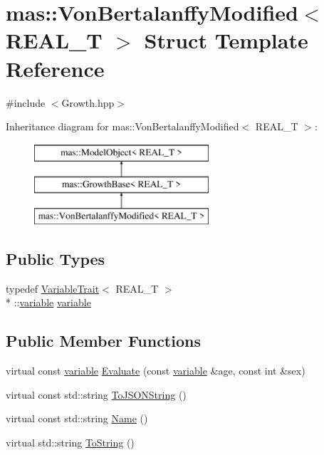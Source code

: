 \hypertarget{structmas_1_1_von_bertalanffy_modified}{\section{mas\-:\-:Von\-Bertalanffy\-Modified$<$ R\-E\-A\-L\-\_\-\-T $>$ Struct Template Reference}
\label{structmas_1_1_von_bertalanffy_modified}
}


{\ttfamily \#include $<$Growth.\-hpp$>$}

Inheritance diagram for mas\-:\-:Von\-Bertalanffy\-Modified$<$ R\-E\-A\-L\-\_\-\-T $>$\-:\begin{figure}[H]
\begin{center}
\leavevmode
\includegraphics[height=3.000000cm]{structmas_1_1_von_bertalanffy_modified}
\end{center}
\end{figure}
\subsection*{Public Types}
\begin{DoxyCompactItemize}
\item 
typedef \hyperlink{structmas_1_1_variable_trait}{Variable\-Trait}$<$ R\-E\-A\-L\-\_\-\-T $>$\\*
\-::\hyperlink{structmas_1_1_von_bertalanffy_modified_af5a89449b12de884a01c34464ba2bae0}{variable} \hyperlink{structmas_1_1_von_bertalanffy_modified_af5a89449b12de884a01c34464ba2bae0}{variable}
\end{DoxyCompactItemize}
\subsection*{Public Member Functions}
\begin{DoxyCompactItemize}
\item 
virtual const \hyperlink{structmas_1_1_von_bertalanffy_modified_af5a89449b12de884a01c34464ba2bae0}{variable} \hyperlink{structmas_1_1_von_bertalanffy_modified_ac5e51a32119b7353bb32d64f440416c7}{Evaluate} (const \hyperlink{structmas_1_1_von_bertalanffy_modified_af5a89449b12de884a01c34464ba2bae0}{variable} \&age, const int \&sex)
\item 
virtual const std\-::string \hyperlink{structmas_1_1_von_bertalanffy_modified_a47465618fc2471ad0f47f94fe3974597}{To\-J\-S\-O\-N\-String} ()
\item 
virtual const std\-::string \hyperlink{structmas_1_1_von_bertalanffy_modified_a6c845df6e13d5219cd56614d323aaa79}{Name} ()
\item 
virtual std\-::string \hyperlink{structmas_1_1_von_bertalanffy_modified_a45e40092ed15953212d65c406908d708}{To\-String} ()
\end{DoxyCompactItemize}
